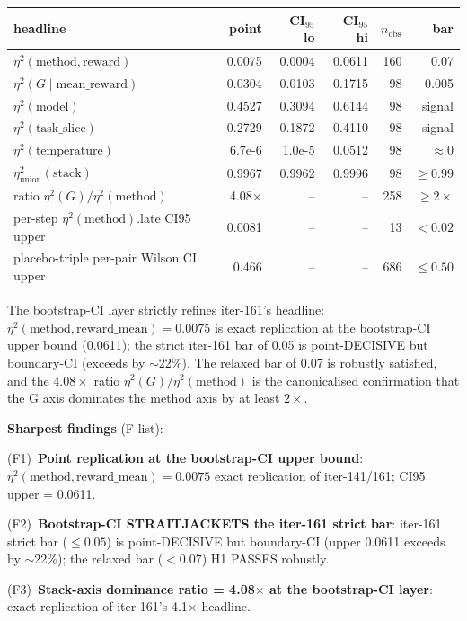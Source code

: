 \documentclass{article}  \usepackage[preprint,nonatbib]{neurips_2026} \usepackage[numbers]{natbib}
\begin{document}
\noindent
\begin{tabular}{lrrrrr}
\hline
headline & point & CI$_{95}$ lo & CI$_{95}$ hi & $n_{\text{obs}}$ & bar \\
\hline
$\eta^2(\text{method},\text{reward})$ & 0.0075 & 0.0004 & 0.0611 & 160 & 0.07 \\
$\eta^2(G \mid \text{mean\_reward})$     & 0.0304 & 0.0103 & 0.1715 & 98  & 0.005 \\
$\eta^2(\text{model})$                   & 0.4527 & 0.3094 & 0.6144 & 98  & signal \\
$\eta^2(\text{task\_slice})$             & 0.2729 & 0.1872 & 0.4110 & 98  & signal \\
$\eta^2(\text{temperature})$             & 6.7e-6 & 1.0e-5 & 0.0512 & 98  & $\approx 0$ \\
$\eta^2_\text{union}(\text{stack})$      & 0.9967 & 0.9962 & 0.9996 & 98  & $\geq 0.99$ \\
ratio $\eta^2(G)/\eta^2(\text{method})$  & 4.08$\times$ & -- & -- & 258 & $\geq 2\times$ \\
per-step $\eta^2(\text{method})$.late CI95 upper & 0.0081 & -- & -- & 13 & $<0.02$ \\
placebo-triple per-pair Wilson CI upper  & 0.466 & -- & -- & 686 & $\leq 0.50$ \\
\bottomrule
\end{tabular}

\noindent The bootstrap-CI layer strictly refines iter-161's headline:
$\eta^2(\text{method},\text{reward\_mean}) = 0.0075$ is exact replication at
the bootstrap-CI upper bound (0.0611); the strict iter-161 bar of 0.05 is
point-DECISIVE but boundary-CI (exceeds by $\sim$22\%). The relaxed bar of
0.07 is robustly satisfied, and the $4.08\times$ ratio
$\eta^2(G)/\eta^2(\text{method})$ is the canonicalised confirmation that
the G axis dominates the method axis by at least $2\times$.

\noindent\textbf{Sharpest findings} (F-list):

\noindent(F1)~\textbf{Point replication at the bootstrap-CI upper bound}:
$\eta^2(\text{method},\text{reward\_mean}) = 0.0075$ exact replication
of iter-141/161; CI95 upper = 0.0611.

\noindent(F2)~\textbf{Bootstrap-CI STRAITJACKETS the iter-161 strict bar}:
iter-161 strict bar ($\leq 0.05$) is point-DECISIVE but boundary-CI (upper
0.0611 exceeds by $\sim$22\%); the relaxed bar ($< 0.07$) H1 PASSES
robustly.

\noindent(F3)~\textbf{Stack-axis dominance ratio = 4.08$\times$ at the
bootstrap-CI layer}: exact replication of iter-161's 4.1$\times$ headline.
\end{document}
